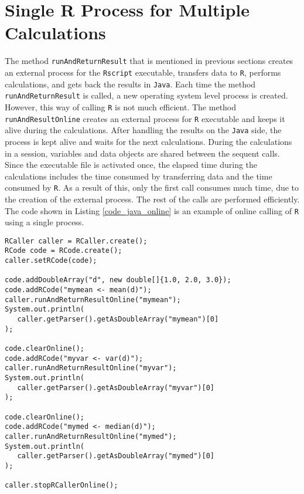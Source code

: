 \documentclass[10pt,a4paper, final, oneside]{article}
\begin{document}
\section{Single R Process for Multiple Calculations}
\label{sec:single_R_Process_for_multiple_calculations}
The method \texttt{runAndReturnResult} that is mentioned in previous sections creates an external process for the \texttt{Rscript} executable, transfers data to \texttt{R}, performs calculations, and gets back the results in \texttt{Java}. Each time the method \texttt{runAndReturnResult} is called, a new operating system level process is created. However, this way of calling \texttt{R} is not much efficient. The method \texttt{runAndResultOnline} creates an external process for \texttt{R} executable and keeps it alive during the calculations. After handling the results on the \texttt{Java} side, the process is kept alive and waits for the next calculations. During the calculations in a session, variables and data objects are shared between the sequent calls. Since the executable file is activated once, the elapsed time during the calculations includes the time consumed by transferring data and the time consumed by \texttt{R}. As a result of this, only the first call consumes much time, due to the creation of the external process. The rest of the calls are performed efficiently. The code shown in Listing \ref{code_java_online} is an example of online calling of \texttt{R} using a single process.


\begin{minipage}{\linewidth}
\begin{lstlisting}[caption=RCaller Online,label=code_java_online]
RCaller caller = RCaller.create();
RCode code = RCode.create();
caller.setRCode(code);

code.addDoubleArray("d", new double[]{1.0, 2.0, 3.0});
code.addRCode("mymean <- mean(d)");
caller.runAndReturnResultOnline("mymean");
System.out.println(
   caller.getParser().getAsDoubleArray("mymean")[0]
);

code.clearOnline();
code.addRCode("myvar <- var(d)");
caller.runAndReturnResultOnline("myvar");
System.out.println(
   caller.getParser().getAsDoubleArray("myvar")[0]
);

code.clearOnline();
code.addRCode("mymed <- median(d)");
caller.runAndReturnResultOnline("mymed");
System.out.println(
   caller.getParser().getAsDoubleArray("mymed")[0]
);

caller.stopRCallerOnline();
\end{lstlisting}
\end{minipage}
\end{document}
